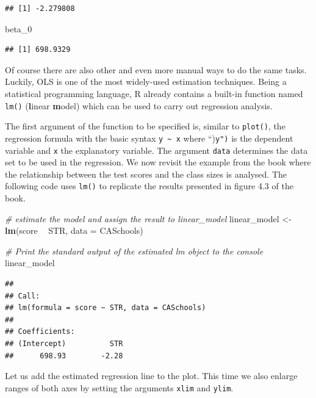 \documentclass[]{book}
\newenvironment{Shaded}{\begin{snugshade}}{\end{snugshade}}
\newcommand{\KeywordTok}[1]{\textcolor[rgb]{0.13,0.29,0.53}{\textbf{#1}}}
\newcommand{\DataTypeTok}[1]{\textcolor[rgb]{0.13,0.29,0.53}{#1}}
\newcommand{\DecValTok}[1]{\textcolor[rgb]{0.00,0.00,0.81}{#1}}
\newcommand{\StringTok}[1]{\textcolor[rgb]{0.31,0.60,0.02}{#1}}
\newcommand{\CommentTok}[1]{\textcolor[rgb]{0.56,0.35,0.01}{\textit{#1}}}
\newcommand{\OperatorTok}[1]{\textcolor[rgb]{0.81,0.36,0.00}{\textbf{#1}}}
\newcommand{\NormalTok}[1]{#1}
\theoremstyle{definition}
\theoremstyle{definition}
\theoremstyle{definition}
\theoremstyle{remark}
\begin{document}
\begin{verbatim}
## [1] -2.279808
\end{verbatim}

\begin{Shaded}
\begin{Highlighting}[]
\NormalTok{beta_}\DecValTok{0}
\end{Highlighting}
\end{Shaded}

\begin{verbatim}
## [1] 698.9329
\end{verbatim}

Of course there are also other and even more manual ways to do the same
tasks. Luckily, OLS is one of the most widely-used estimation
techniques. Being a statistical programming language, R already contains
a built-in function named \texttt{lm()} (\textbf{l}inear \textbf{m}odel)
which can be used to carry out regression analysis.

The first argument of the function to be specified is, similar to
\texttt{plot()}, the regression formula with the basic syntax
\texttt{y \textasciitilde{} x} where ``)\texttt{y")} is the dependent
variable and \texttt{x} the explanatory variable. The argument
\texttt{data} determines the data set to be used in the regression. We
now revisit the example from the book where the relationship between the
test scores and the class sizes is analysed. The following code uses
\texttt{lm()} to replicate the results presented in figure 4.3 of the
book.

\begin{Shaded}
\begin{Highlighting}[]
\CommentTok{# estimate the model and assign the result to linear_model}
\NormalTok{linear_model <-}\StringTok{ }\KeywordTok{lm}\NormalTok{(score }\OperatorTok{~}\StringTok{ }\NormalTok{STR, }\DataTypeTok{data =}\NormalTok{ CASchools)}

\CommentTok{# Print the standard output of the estimated lm object to the console }
\NormalTok{linear_model}
\end{Highlighting}
\end{Shaded}

\begin{verbatim}
## 
## Call:
## lm(formula = score ~ STR, data = CASchools)
## 
## Coefficients:
## (Intercept)          STR  
##      698.93        -2.28
\end{verbatim}

Let us add the estimated regression line to the plot. This time we also
enlarge ranges of both axes by setting the arguments \texttt{xlim} and
\texttt{ylim}.
\end{document}
